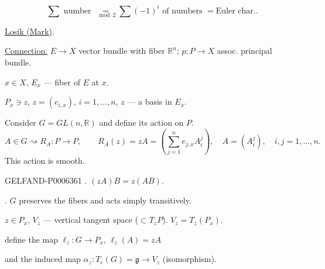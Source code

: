 \[
\sum\text{ number }
\underset{\bmod 2}{=}
\sum(-1)^i\text{ of numbers }=\text{Euler char.}.
\]

\underline{Losik (Mark)}.

\underline{Connection.} \(E\to X\) vector bundle with fiber \(\mathbb R^n\);
\(p:P\to X\) assoc. principal bundle.

\(x\in X\), \(E_x\) --- fiber of \(E\) at \(x\).

\(P_x\ni z\), \(z=(e_{i,x})\), \(i=1,\ldots,n\),
\(z\) --- a basis in \(E_x\).

Consider \(G=GL(n,\mathbb R)\) and define its action on \(P\).
\[
A\in G\rightsquigarrow R_A:P\to P,\qquad
R_A(z)=zA=\left(\sum_{j=1}^{n}e_{j,x}A_i^j\right),
\quad A=(A_i^j),\quad i,j=1,\ldots,n.
\]
This action is smooth.


\begin{GelfandAdjacentEvidence}{GELFAND-P000636}{1}
. \((zA)B=z(AB)\).

. \(G\) preserves the fibers and acts simply transitively.

\(z\in P_x\), \(V_z\) --- vertical tangent space (\(\subset T_zP\)).
\(V_z=T_z(P_x)\).

define the map \(\ell_z:G\to P_x\), \(\ell_z(A)=zA\)

and the induced map \(\alpha_z:T_e(G)=\mathfrak g\to V_z\) (isomorphism).
\end{GelfandAdjacentEvidence}
